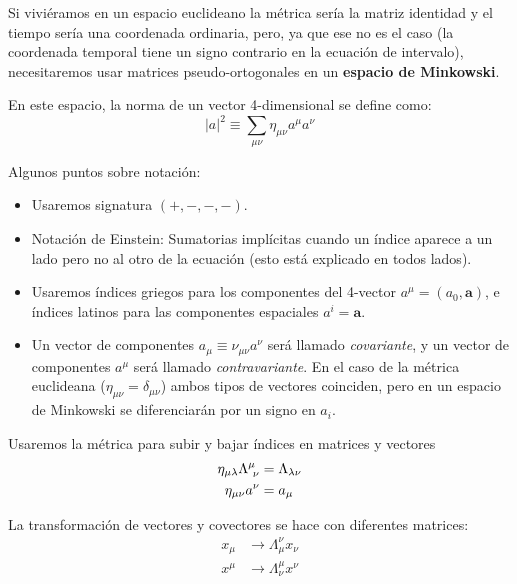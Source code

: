 \documentclass[]{article}
\numberwithin{equation}{section}
\begin{document}
Si viviéramos en un espacio euclideano la métrica sería la matriz identidad y el tiempo sería una coordenada ordinaria, pero, ya que ese no es el caso (la coordenada temporal tiene un signo contrario en la ecuación de intervalo), necesitaremos usar matrices pseudo-ortogonales en un \textbf{espacio de Minkowski}.

En este espacio, la norma de un vector 4-dimensional se define como:
\begin{equation}
	|a|^2 \equiv \sum_{\mu\nu} \eta_{\mu\nu}a^\mu a^\nu
\end{equation}

Algunos puntos sobre notación:
\begin{itemize}
	\item Usaremos signatura $(+,-,-,-)$.
	\item Notación de Einstein: Sumatorias implícitas cuando un índice aparece a un lado pero no al otro de la  ecuación (esto está explicado en todos lados).
	\item Usaremos índices griegos para los componentes del 4-vector $a^\mu=(a_0,\mathbf{a})$, e índices latinos para las componentes espaciales $a^i=\mathbf{a}$.
	\item Un vector de componentes $a_\mu\equiv\nu_{\mu\nu}a^\nu$ será llamado \textit{covariante}, y un vector de componentes $a^\mu$ será llamado \textit{contravariante}. En el caso de la métrica euclideana ($\eta_{\mu\nu} = \delta_{\mu\nu}$) ambos tipos de vectores coinciden, pero en un espacio de Minkowski se diferenciarán por un signo en $a_i$.
\end{itemize}

Usaremos la métrica para subir y bajar índices en matrices y vectores
\begin{align}
	 \eta_{\mu\lambda}\LambdaMuNu &= \Lambda_{\lambda\nu}\\
	\eta_{\mu\nu}a^\nu &= a_\mu
\end{align}

La transformación de vectores y covectores se hace con diferentes matrices:
\begin{align}
	x_\mu &\rightarrow \Lambda_\mu^\nu x_\nu \\
	x^\mu &\rightarrow \Lambda^\mu_\nu x^\nu
\end{align}
\end{document}
